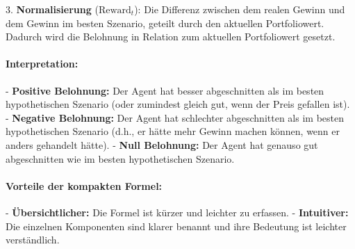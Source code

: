 3. \textbf{Normalisierung} (\(\text{Reward}_t\)): Die Differenz zwischen dem realen Gewinn und dem Gewinn im besten Szenario, geteilt durch den aktuellen Portfoliowert. Dadurch wird die Belohnung in Relation zum aktuellen Portfoliowert gesetzt.

\paragraph{Interpretation:}

- \textbf{Positive Belohnung:} Der Agent hat besser abgeschnitten als im besten hypothetischen Szenario (oder zumindest gleich gut, wenn der Preis gefallen ist).
- \textbf{Negative Belohnung:} Der Agent hat schlechter abgeschnitten als im besten hypothetischen Szenario (d.h., er hätte mehr Gewinn machen können, wenn er anders gehandelt hätte).
- \textbf{Null Belohnung:} Der Agent hat genauso gut abgeschnitten wie im besten hypothetischen Szenario.

\paragraph{Vorteile der kompakten Formel:}

- \textbf{Übersichtlicher:} Die Formel ist kürzer und leichter zu erfassen.
- \textbf{Intuitiver:} Die einzelnen Komponenten sind klarer benannt und ihre Bedeutung ist leichter verständlich.
